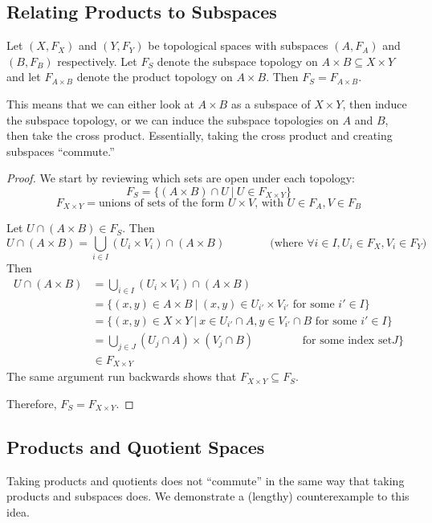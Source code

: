 \subsection{Relating Products to Subspaces} 
\begin{smallfact}
	Let $(X, F_X)$ and $(Y, F_Y)$ be topological spaces with subspaces $(A, F_A)$ and $(B, F_B)$ respectively. Let $F_S$ denote the subspace topology on $A\times B\subseteq X\times Y$ and let $F_{A\times B}$ denote the product topology on $A\times B$. Then $F_S = F_{A\times B}$. 
\end{smallfact}
This means that we can either look at $A\times B$ as a subspace of $X\times Y$, then induce the subspace topology, or we can induce the subspace topologies on $A$ and $B$, then take the cross product. Essentially, taking the cross product and creating subspaces ``commute.'' 
\begin{proof}
	We start by reviewing which sets are open under each topology:
	\[ F_S = \{ (A\times B)\cap U\ |\ U\in F_{X\times Y} \}\]
	\[ F_{X\times Y} = \text{unions of sets of the form } U\times V\text{, with } U\in F_A, V\in F_B \]
	
	Let $U\cap(A\times B)\in F_S$. Then
	\[ U\cap(A\times B) = \bigcup_{i\in I} (U_i\times V_i)\cap (A\times B) \qquad\qquad\text{(where }\forall i\in I, U_i\in F_X, V_i\in F_Y)\]
	Then 
	\begin{align*}
		U\cap(A\times B) &= \bigcup_{i\in I} (U_i\times V_i)\cap (A\times B)\\
		&= \{ (x,y)\in A\times B\ |\ (x,y)\in U_{i'}\times V_{i'}\text{ for some }i'\in I \} \\
		&= \{ (x,y)\in X\times Y\ |\ x\in U_{i'}\cap A, y\in V_{i'}\cap B\text{ for some }i'\in I\} \\
		&= \bigcup_{j\in J} (U_j\cap A)\times (V_j\cap B)\qquad\qquad\text{ for some index set} J \}\\
		&\in F_{X\times Y} 
	\end{align*}
	The same argument run backwards shows that $F_{X\times Y}\subseteq F_S$.
	
	Therefore, $F_{S} = F_{X\times Y}$. 
\end{proof}

\subsection{Products and Quotient Spaces} Taking products and quotients does not ``commute'' in the same way that taking products and subspaces does. We demonstrate a (lengthy) counterexample to this idea.

